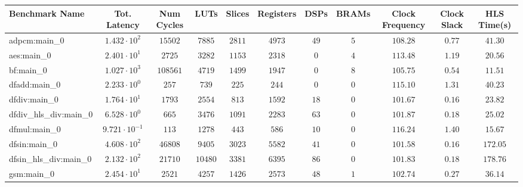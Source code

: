 \begin{tabular}{|l|c|c|c|c|c|c|c|c|c|c|}
\hline
Benchmark Name          & Tot. Latency            & Num Cycles & LUTs      & Slices    & Registers & DSPs    & BRAMs  & Clock Frequency & Clock Slack & HLS Time(s) \\
\hline
adpcm:main\_0           & $ 1.432 \cdot 10^{2}  $ & $ 15502  $ & $ 7885  $ & $ 2811  $ & $ 4973  $ & $ 49  $ & $ 5  $ & $ 108.28      $ & $ 0.77    $ & $ 41.30   $ \\
aes:main\_0             & $ 2.401 \cdot 10^{1}  $ & $ 2725   $ & $ 3282  $ & $ 1153  $ & $ 2318  $ & $ 0   $ & $ 4  $ & $ 113.48      $ & $ 1.19    $ & $ 20.56   $ \\
bf:main\_0              & $ 1.027 \cdot 10^{3}  $ & $ 108561 $ & $ 4719  $ & $ 1499  $ & $ 1947  $ & $ 0   $ & $ 8  $ & $ 105.75      $ & $ 0.54    $ & $ 11.51   $ \\
dfadd:main\_0           & $ 2.233 \cdot 10^{0}  $ & $ 257    $ & $ 739   $ & $ 225   $ & $ 244   $ & $ 0   $ & $ 0  $ & $ 115.10      $ & $ 1.31    $ & $ 40.23   $ \\
dfdiv:main\_0           & $ 1.764 \cdot 10^{1}  $ & $ 1793   $ & $ 2554  $ & $ 813   $ & $ 1592  $ & $ 18  $ & $ 0  $ & $ 101.67      $ & $ 0.16    $ & $ 23.82   $ \\
dfdiv\_hls\_div:main\_0 & $ 6.528 \cdot 10^{0}  $ & $ 665    $ & $ 3476  $ & $ 1091  $ & $ 2283  $ & $ 63  $ & $ 0  $ & $ 101.87      $ & $ 0.18    $ & $ 25.02   $ \\
dfmul:main\_0           & $ 9.721 \cdot 10^{-1} $ & $ 113    $ & $ 1278  $ & $ 443   $ & $ 586   $ & $ 10  $ & $ 0  $ & $ 116.24      $ & $ 1.40    $ & $ 15.67   $ \\
dfsin:main\_0           & $ 4.608 \cdot 10^{2}  $ & $ 46808  $ & $ 9405  $ & $ 3023  $ & $ 5582  $ & $ 41  $ & $ 0  $ & $ 101.58      $ & $ 0.16    $ & $ 172.05  $ \\
dfsin\_hls\_div:main\_0 & $ 2.132 \cdot 10^{2}  $ & $ 21710  $ & $ 10480 $ & $ 3381  $ & $ 6395  $ & $ 86  $ & $ 0  $ & $ 101.83      $ & $ 0.18    $ & $ 178.76  $ \\
gsm:main\_0             & $ 2.454 \cdot 10^{1}  $ & $ 2521   $ & $ 4257  $ & $ 1426  $ & $ 2573  $ & $ 48  $ & $ 1  $ & $ 102.74      $ & $ 0.27    $ & $ 36.14   $ \\

\end{tabular}

